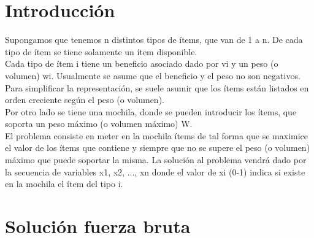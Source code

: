 	\listoftables %
	
	\newpage
	
	\section[Introducción]{Introducción}

	 Supongamos que tenemos n distintos tipos de ítems, que van de 1 a n. De cada tipo de ítem se tiene solamente un ítem disponible. \\
	
	Cada tipo de ítem i tiene un beneficio asociado dado por vi y un peso (o volumen) wi. Usualmente se asume que el beneficio y el peso no son negativos. Para simplificar la representación, se suele asumir que los ítems están listados en orden creciente según el peso (o volumen). \\
	
	Por otro lado se tiene una mochila, donde se pueden introducir los ítems, que soporta un peso máximo (o volumen máximo) W. \\
	
	El problema consiste en meter en la mochila ítems de tal forma que se maximice el valor de los ítems que contiene y siempre que no se supere el peso (o volumen) máximo que puede soportar la misma. La solución al problema vendrá dado por la secuencia de variables x1, x2, ..., xn donde el valor de xi (0-1) indica si existe en la mochila el ítem del tipo i. \\
	
	\section[Solución fuerza bruta]{Solución fuerza bruta}

	
	\lstset{language=C}
	\begin{lstlisting}[frame=single]

	\end{lstlisting} 
	
